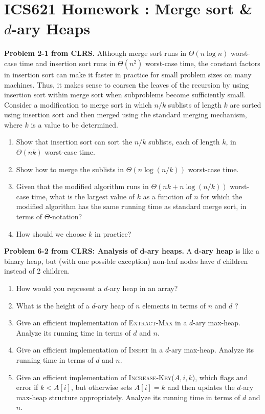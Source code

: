 \documentclass[11pt,letterpaper]{article}
\newcommand{\homework}[2]{
\setcounter{section}{#1}
\section*{ICS621 Homework {\thesection}: {#2} }
{\markboth{#2}{#2}}
}
\begin{document}
\homework{1}{Merge sort \& $d$-ary Heaps}

\textbf{Problem 2-1 from CLRS.} Although merge sort runs in
$\Theta(n \log n)$ worst-case time and insertion sort runs
in $\Theta(n^2)$ worst-case time, the constant factors in
insertion sort can make it faster in practice for small
problem sizes on many machines. Thus, it makes sense to
coarsen the leaves of the recursion by using insertion sort
within merge sort when subproblems become sufficiently
small. Consider a modification to merge sort in which $n/k$
sublists of length $k$ are sorted using insertion sort and
then merged using the standard merging mechanism, where $k$
is a value to be determined.
\begin{enumerate}[label=\alph*),labelindent=0pt]
\item Show that insertion sort can sort the $n/k$ sublists,
each of length $k$, in $\Theta(nk)$ worst-case time.
\item Show how to merge the sublists in $\Theta(n
\log(n/k))$ worst-case time.
\item Given that the modified algorithm runs in
$\Theta(nk+n\log(n/k))$ worst-case time, what is the largest
value of $k$ as a function of $n$ for which the modified
algorithm has the same running time as standard merge sort,
in terms of $\Theta$-notation?
\item How should we choose $k$ in practice?
\end{enumerate}

\noindent
\textbf{Problem 6-2 from CLRS: Analysis of d-ary heaps.}  
A \textbf{d-ary heap} is like a binary heap, but (with one
possible exception) non-leaf nodes have $d$ children instead
of 2 children.
\begin{enumerate}[label=\alph*),labelindent=0pt]
\item How would you represent a $d$-ary heap in an array?
\item What is the height of a $d$-ary heap of $n$ elements
in terms of $n$ and $d$ ?
\item Give an efficient implementation of
\textsc{Extract-Max} in a $d$-ary max-heap. Analyze its
running time in terms of $d$ and $n$.
\item Give an efficient implementation of \textsc{Insert} in
a $d$-ary max-heap. Analyze its running time in terms of $d$
and $n$.
\item Give an efficient implementation of
\textsc{Increase-Key($A,i,k$)}, which flags and error if
$k<A[i]$, but otherwise sets $A[i]=k$ and then updates the
$d$-ary max-heap structure appropriately. Analyze its
running time in terms of $d$ and $n$.
\end{enumerate}
\end{document}
